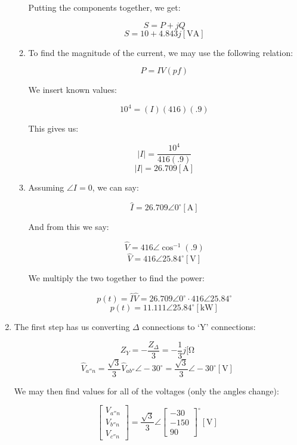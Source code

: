 \begin{enumerate}
\begin{enumerate}
        Putting the components together, we get:

        $$S=P+jQ$$
        $$\boxed{S=10+4.843j[\si{\volt\ampere}]}$$

      \item To find the magnitude of the current, we may use the following relation:

        $$P=IV(pf)$$

        We insert known values:

        $$10^4=(I)(416)(.9)$$

        This gives us:

        $$|I|=\frac{10^4}{416(.9)}$$
        $$\boxed{|I|=26.709[\si{\ampere}]}$$

      \item Assuming $\angle I=0$, we can say:

        $$\hat{I}=26.709\angle 0^{\circ}[\si{\ampere}]$$

        And from this we say:

        $$\hat{V}=416\angle\cos^{-1}(.9)$$
        $$\hat{V}=416\angle 25.84^{\circ}[\si{\volt}]$$

        We multiply the two together to find the power:

        $$p(t)=\hat{I}\hat{V}=26.709\angle 0^{\circ}\cdot416\angle 25.84^{\circ}$$
        $$p(t)=11.111\angle25.84^{\circ}[\si{\kilo\watt}]$$

    \end{enumerate}

    \setcounter{enumi}{10}

  \item

    The first step has us converting $\Delta$ connections to `Y' connections:

    $$Z_Y=-\frac{Z_{\Delta}}{3}=-\frac{1}{3}j[\si{\ohm}$$
    $$\hat{V}_{a''n}=\frac{\sqrt{3}}{3}\hat{V}_{ab''}\angle-30^{\circ}=\frac{\sqrt{3}}{3}\angle-30^{\circ}[\si{\volt}]$$

    We may then find values for all of the voltages (only the angles change):

    $$\left[ \begin{matrix} V_{a''n}\\V_{b''n}\\V_{c''n} \end{matrix}\right]=\frac{\sqrt{3}}{3}\angle\left[ \begin{matrix} -30\\-150\\90\end{matrix} \right]^{\circ}[\si{\volt}]$$


\end{enumerate}
